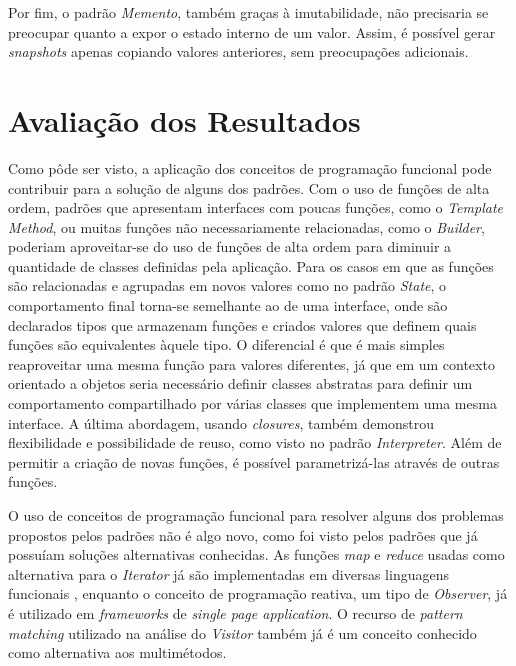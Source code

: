Por fim, o padrão \textit{Memento}, também graças à 
imutabilidade, não precisaria se preocupar quanto 
a expor o estado interno de um valor. Assim, é 
possível gerar \textit{snapshots} apenas copiando 
valores anteriores, sem preocupações adicionais. 

\section{Avaliação dos Resultados}

Como pôde ser visto, a aplicação dos 
conceitos de programação funcional pode 
contribuir para a solução de alguns dos padrões. 
Com o uso de funções de alta ordem, padrões 
que apresentam interfaces com poucas funções, como o 
\textit{Template Method}, ou muitas funções 
não necessariamente relacionadas, como 
o \textit{Builder}, poderiam aproveitar-se do 
uso de funções de alta ordem para diminuir a 
quantidade de classes definidas pela 
aplicação. Para os casos em que as funções 
são relacionadas e agrupadas em 
novos valores como no padrão \textit{State}, 
o comportamento final torna-se semelhante 
ao de uma interface, onde são declarados 
tipos que armazenam funções e criados 
valores que definem quais funções são 
equivalentes àquele tipo. 
O diferencial é que 
é mais simples reaproveitar uma mesma 
função para valores diferentes, já que 
em um contexto orientado a objetos seria 
necessário definir classes abstratas 
para definir um comportamento compartilhado 
por várias classes que implementem uma 
mesma interface.
A última abordagem, usando \textit{closures}, também 
demonstrou flexibilidade e possibilidade 
de reuso, como visto no padrão \textit{Interpreter}. 
Além de permitir a criação de novas funções, 
é possível parametrizá-las através de 
outras funções.

O uso de conceitos de programação funcional 
para resolver alguns dos problemas propostos 
pelos padrões não é algo novo, como foi visto 
pelos padrões que já possuíam soluções alternativas 
conhecidas. As funções \textit{map} e \textit{reduce} 
usadas como alternativa para o \textit{Iterator} já 
são implementadas em diversas linguagens funcionais
\cite{realworldhaskell,wampler2021,braveclojure}, 
enquanto o conceito de programação reativa, 
um tipo de \textit{Observer}, já é 
utilizado em \textit{frameworks} de  
\textit{single page application}\cite{rxjs}. 
O recurso de \textit{pattern matching} 
utilizado na análise do \textit{Visitor} também já 
é um conceito conhecido como alternativa 
aos multimétodos\cite{patternmatchingvisitor}.

